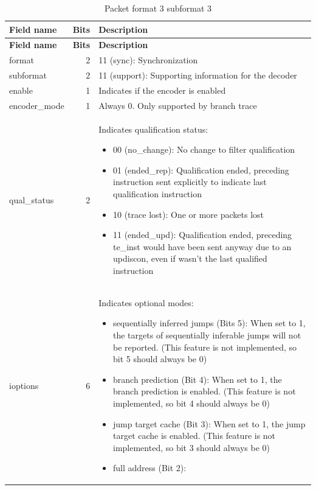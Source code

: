 \documentclass[main\_\_EN.tex]{subfiles}
\begin{document}
\begin{longtable}[c]{ |l|r|L{10cm}| }
    \caption{Packet format 3 subformat 3}
    \label{tab:f3s3}
    \\\hline{}
    \textbf{Field name} & \textbf{Bits} & \textbf{Description} \\\hline
    \endfirsthead
    \hline{}
    \textbf{Field name} & \textbf{Bits} & \textbf{Description} \\\hline
    \endhead
    \endfoot
    \endlastfoot

    format & 2 & 11 (sync): Synchronization \\\hline
    subformat & 2 & 11 (support): Supporting information for the decoder \\\hline
    enable & 1 & Indicates if the encoder is enabled \\\hline
    encoder\_mode & 1 & Always 0. Only supported by branch trace \\\hline
    qual\_status & 2 & Indicates qualification status:
    \begin{itemize}
        \item 00 (no\_change): No change to filter qualification
        \item 01 (ended\_rep): Qualification ended, preceding instruction sent explicitly to indicate last qualification instruction
        \item 10 (trace lost): One or more packets lost
        \item 11 (ended\_upd): Qualification ended, preceding te\_inst would have been sent anyway due to an updiscon, even if wasn't the last qualified instruction
        \vspace{-1.5em}
    \end{itemize}
    \\\hline
    ioptions & 6 & Indicates optional modes:
    \begin{itemize}
        \item sequentially inferred jumps (Bits 5): When set to 1, the targets of sequentially inferable jumps will not be reported. (This feature is not implemented, so bit 5 should always be 0)
        \item branch prediction (Bit 4): When set to 1, the branch prediction is enabled. (This feature is not implemented, so bit 4 should always be 0)
        \item jump target cache (Bit 3): When set to 1, the jump target cache is enabled. (This feature is not implemented, so bit 3 should always be 0)
        \item full address (Bit 2):

\end{itemize}
\end{longtable}
\end{document}
